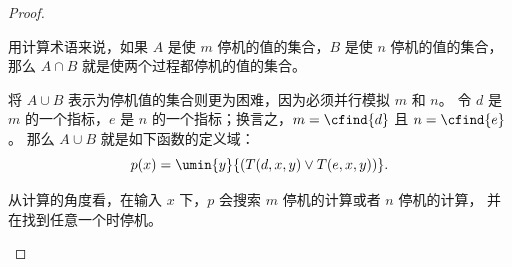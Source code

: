 \documentclass[../../../include/open-logic-section]{subfiles}
\begin{document}
\begin{proof}
\begin{explain}
用计算术语来说，如果 $A$ 是使 $m$ 停机的值的集合，$B$ 是使 $n$ 停机的值的集合，
那么 $A \cap B$ 就是使两个过程都停机的值的集合。
\end{explain}

将 $A \cup B$ 表示为停机值的集合则更为困难，因为必须并行模拟 $m$ 和 $n$。
令 $d$ 是 $m$ 的一个指标，$e$ 是 $n$ 的一个指标；换言之，$m = \cfind{d}$ 且 $n = \cfind{e}$。
那么 $A \cup B$ 就是如下函数的定义域：
\[
p(x) = \umin{y}{(T(d,x,y) \lor T(e,x,y))}.
\]
\begin{explain}
从计算的角度看，在输入 $x$ 下，$p$ 会搜索 $m$ 停机的计算或者 $n$ 停机的计算，
并在找到任意一个时停机。
\end{explain}
\end{proof}
\end{document}
